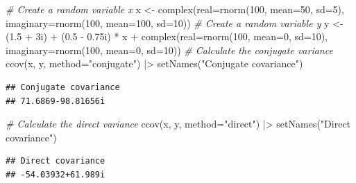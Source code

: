 \documentclass[
]{book}
\newenvironment{Shaded}{\begin{snugshade}}{\end{snugshade}}
\newcommand{\AttributeTok}[1]{\textcolor[rgb]{0.77,0.63,0.00}{#1}}
\newcommand{\CommentTok}[1]{\textcolor[rgb]{0.56,0.35,0.01}{\textit{#1}}}
\newcommand{\DecValTok}[1]{\textcolor[rgb]{0.00,0.00,0.81}{#1}}
\newcommand{\FloatTok}[1]{\textcolor[rgb]{0.00,0.00,0.81}{#1}}
\newcommand{\FunctionTok}[1]{\textcolor[rgb]{0.00,0.00,0.00}{#1}}
\newcommand{\NormalTok}[1]{#1}
\newcommand{\OtherTok}[1]{\textcolor[rgb]{0.56,0.35,0.01}{#1}}
\newcommand{\SpecialCharTok}[1]{\textcolor[rgb]{0.00,0.00,0.00}{#1}}
\newcommand{\StringTok}[1]{\textcolor[rgb]{0.31,0.60,0.02}{#1}}
\begin{document}
\begin{Shaded}
\begin{Highlighting}[]
\CommentTok{\# Create a random variable x}
\NormalTok{x }\OtherTok{\textless{}{-}} \FunctionTok{complex}\NormalTok{(}\AttributeTok{real=}\FunctionTok{rnorm}\NormalTok{(}\DecValTok{100}\NormalTok{, }\AttributeTok{mean=}\DecValTok{50}\NormalTok{, }\AttributeTok{sd=}\DecValTok{5}\NormalTok{),}
             \AttributeTok{imaginary=}\FunctionTok{rnorm}\NormalTok{(}\DecValTok{100}\NormalTok{, }\AttributeTok{mean=}\DecValTok{100}\NormalTok{, }\AttributeTok{sd=}\DecValTok{10}\NormalTok{))}
\CommentTok{\# Create a random variable y}
\NormalTok{y }\OtherTok{\textless{}{-}}\NormalTok{ (}\FloatTok{1.5} \SpecialCharTok{+}\NormalTok{ 3i) }\SpecialCharTok{+}\NormalTok{ (}\FloatTok{0.5} \SpecialCharTok{{-}} \FloatTok{0.75}\NormalTok{i) }\SpecialCharTok{*}\NormalTok{ x }\SpecialCharTok{+}
            \FunctionTok{complex}\NormalTok{(}\AttributeTok{real=}\FunctionTok{rnorm}\NormalTok{(}\DecValTok{100}\NormalTok{, }\AttributeTok{mean=}\DecValTok{0}\NormalTok{, }\AttributeTok{sd=}\DecValTok{10}\NormalTok{),}
                    \AttributeTok{imaginary=}\FunctionTok{rnorm}\NormalTok{(}\DecValTok{100}\NormalTok{, }\AttributeTok{mean=}\DecValTok{0}\NormalTok{, }\AttributeTok{sd=}\DecValTok{10}\NormalTok{))}
\CommentTok{\# Calculate the conjugate variance}
\FunctionTok{ccov}\NormalTok{(x, y, }\AttributeTok{method=}\StringTok{"conjugate"}\NormalTok{) }\SpecialCharTok{|\textgreater{}}
    \FunctionTok{setNames}\NormalTok{(}\StringTok{"Conjugate covariance"}\NormalTok{)}
\end{Highlighting}
\end{Shaded}

\begin{verbatim}
## Conjugate covariance 
## 71.6869-98.81656i
\end{verbatim}

\begin{Shaded}
\begin{Highlighting}[]
\CommentTok{\# Calculate the direct variance}
\FunctionTok{ccov}\NormalTok{(x, y, }\AttributeTok{method=}\StringTok{"direct"}\NormalTok{) }\SpecialCharTok{|\textgreater{}}
    \FunctionTok{setNames}\NormalTok{(}\StringTok{"Direct covariance"}\NormalTok{)}
\end{Highlighting}
\end{Shaded}

\begin{verbatim}
## Direct covariance 
## -54.03932+61.989i
\end{verbatim}
\end{document}
